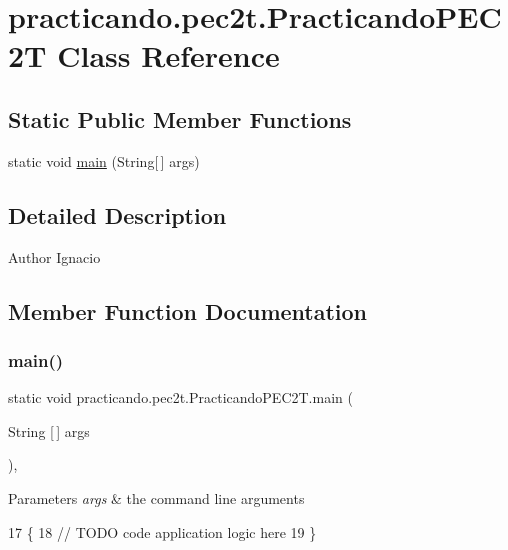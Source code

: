 \hypertarget{classpracticando_1_1pec2t_1_1_practicando_p_e_c2_t}{}\section{practicando.\+pec2t.\+Practicando\+P\+E\+C2T Class Reference}
\label{classpracticando_1_1pec2t_1_1_practicando_p_e_c2_t}
\subsection*{Static Public Member Functions}
\begin{DoxyCompactItemize}
\item 
static void \mbox{\hyperlink{classpracticando_1_1pec2t_1_1_practicando_p_e_c2_t_af04eda2a00284527038b2d36bbe3c6bd}{main}} (String\mbox{[}$\,$\mbox{]} args)
\end{DoxyCompactItemize}


\subsection{Detailed Description}
\begin{DoxyAuthor}{Author}
Ignacio 
\end{DoxyAuthor}


\subsection{Member Function Documentation}
\mbox{\label{classpracticando_1_1pec2t_1_1_practicando_p_e_c2_t_af04eda2a00284527038b2d36bbe3c6bd}} 
\subsubsection{\texorpdfstring{main()}{main()}}
{\footnotesize\ttfamily static void practicando.\+pec2t.\+Practicando\+P\+E\+C2\+T.\+main (\begin{DoxyParamCaption}\item[{String \mbox{[}$\,$\mbox{]}}]{args }\end{DoxyParamCaption})\hspace{0.3cm}{\ttfamily [inline]}, {\ttfamily [static]}}


\begin{DoxyParams}{Parameters}
{\em args} & the command line arguments \\
\hline
\end{DoxyParams}

\begin{DoxyCode}
17                                            \{
18         \textcolor{comment}{// TODO code application logic here}
19     \}
\end{DoxyCode}
